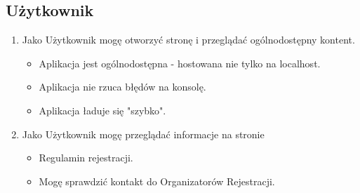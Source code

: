 \documentclass{article}
\begin{document}
\subsection{Użytkownik}
\begin{enumerate}
  \item Jako Użytkownik mogę otworzyć stronę i przeglądać ogólnodostępny kontent.   
      \begin{itemize}
         \item Aplikacja jest ogólnodostępna - hostowana nie tylko na localhost.
         \item Aplikacja nie rzuca błędów na konsolę.
         \item Aplikacja ładuje się "szybko".
       \end{itemize}
  \item Jako Użytkownik mogę przeglądać informacje na stronie
      \begin{itemize}
         \item Regulamin rejestracji.
         \item Mogę sprawdzić kontakt do Organizatorów Rejestracji.
       \end{itemize}
\end{enumerate}
\end{document}
